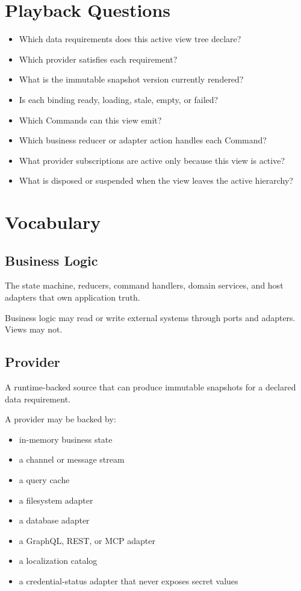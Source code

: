 \section{Playback Questions}\label{record-132-playback-questions}

\begin{itemize}
\tightlist
\item
  Which data requirements does this active view tree declare?
\item
  Which provider satisfies each requirement?
\item
  What is the immutable snapshot version currently rendered?
\item
  Is each binding ready, loading, stale, empty, or failed?
\item
  Which Commands can this view emit?
\item
  Which business reducer or adapter action handles each Command?
\item
  What provider subscriptions are active only because this view is active?
\item
  What is disposed or suspended when the view leaves the active hierarchy?
\end{itemize}

\section{Vocabulary}\label{record-132-vocabulary}

\subsection{Business Logic}\label{record-132-business-logic}

The state machine, reducers, command handlers, domain services, and host adapters that own application truth.

Business logic may read or write external systems through ports and adapters. Views may not.

\subsection{Provider}\label{record-132-provider}

A runtime-backed source that can produce immutable snapshots for a declared data requirement.

A provider may be backed by:

\begin{itemize}
\tightlist
\item
  in-memory business state
\item
  a channel or message stream
\item
  a query cache
\item
  a filesystem adapter
\item
  a database adapter
\item
  a GraphQL, REST, or MCP adapter
\item
  a localization catalog
\item
  a credential-status adapter that never exposes secret values
\end{itemize}

